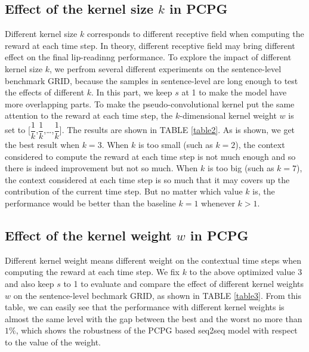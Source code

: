 \documentclass[a4paper, 10pt, conference]{ieeeconf}      %
\begin{document}
	\subsection{Effect of the kernel size $k$ in PCPG} \label{section4.2}
	Different kernel size $k$ corresponds to different receptive field when computing the reward at each time step. In theory, different receptive field may bring different effect on the final lip-readinng performance. To explore the impact of different kernel size $k$, we perfrom several different experiments on the sentence-level benchmark GRID, because the samples in sentence-level are long enough to test the effects of different $k$. In this part, we keep $s$ at 1 to make the model have more overlapping parts. To make the pseudo-convolutional kernel put the same attention to the reward at each time step, the $k$-dimensional kernel weight $w$ is set to [$\dfrac{1}{k}$,$\dfrac{1}{k}$,\dots,$\dfrac{1}{k}$]. The results are shown in TABLE \ref{table2}. As is shown, we get the best result when $k=3$. When $k$ is too small (such as $k=2$), the context considered to compute the reward at each time step is not much enough and so there is indeed improvement but not so much. When $k$ is too big (such as $k=7$), the context considered at each time step is so much that it may covers up the contribution of the current time step. But no matter which value $k$ is, the performance would be better than the baseline $k=1$ whenever $k>1$. 
	
	
	\subsection{Effect of the kernel weight $w$ in PCPG}
	Different kernel weight means different weight on the contextual time steps when computing the reward at each time step. We fix $k$ to the above optimized value 3 and also keep $s$ to 1 to evaluate and compare the effect of different kernel weights $w$ on the sentence-level bechmark GRID, as shown in TABLE \ref{table3}. From this table, we can easily see that the performance with different kernel weights is almost the same level with the gap between the best and the worst no more than $1\%$, which shows the robustness of the PCPG based seq2seq model with respect to the value of the weight.
	
\end{document}
